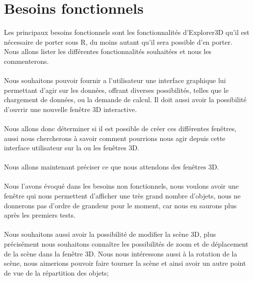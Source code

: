 \section{Besoins fonctionnels}
\paragraph{} 
Les principaux besoins fonctionnels sont les fonctionnalités d'Explorer3D qu'il est nécessaire de porter sous R, du moins autant qu'il sera possible d'en porter.\\
Nous allons lister les différentes fonctionnalités souhaitées et nous les commenterons.

\paragraph{} 
Nous souhaitons pouvoir fournir a l'utilisateur une interface graphique lui permettant d'agir sur les données, offrant diverses possibilités, telles que le chargement de données, ou la demande de calcul. Il doit aussi avoir la possibilité d'ouvrir une nouvelle fenêtre 3D interactive.

\paragraph{}
 Nous allons donc déterminer si il est possible de créer ces différentes fenêtres, aussi nous chercherons à savoir comment pourrions nous agir depuis cette interface utilisateur sur la ou les fenêtres 3D.

\paragraph{} 
Nous allons maintenant préciser ce que nous attendons des fenêtres 3D.

\paragraph{} 
Nous l'avons évoqué dans les besoins non fonctionnels, nous voulons avoir une fenêtre qui nous permettent d'afficher une très grand nombre d'objets, nous ne donnerons pas d'ordre de grandeur pour le moment, car nous en saurons plus après les premiers tests.

\paragraph{}
Nous souhaitons aussi avoir la possibilité de modifier la scène 3D, plus précisément nous souhaitons connaître les possibilités de zoom et de déplacement de la scène dans la fenêtre 3D. Nous nous intéressons aussi à la rotation de la scène, nous aimerions pouvoir faire tourner la scène et ainsi avoir un autre point de vue de la répartition des objets;

